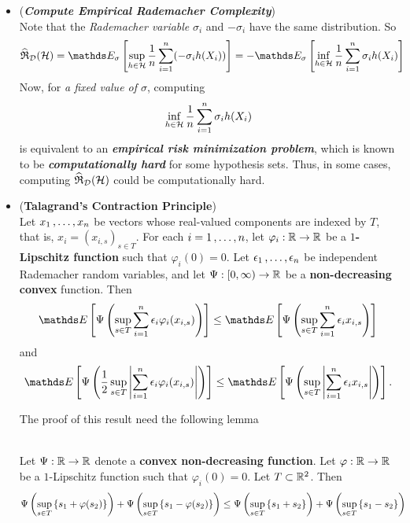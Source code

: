 \documentclass[11pt]{article}
\begin{document}
\begin{itemize}
\item \begin{remark} (\emph{\textbf{Compute Empirical Rademacher Complexity}})\\
Note that the \emph{Rademacher variable} $\sigma_i$ and $-\sigma_i$ have the same distribution. So
\begin{align*}
\widehat{\frR}_{\cD}(\cH)&= \E{\sigma}{\sup_{h \in \cH}\frac{1}{n}\sum_{i=1}^{n}(-\sigma_{i}h(X_i))} = -\E{\sigma}{\inf_{h \in \cH}\frac{1}{n}\sum_{i=1}^{n}\sigma_{i}h(X_i)}
\end{align*} Now, for \emph{a fixed value of $\sigma$}, computing 
\begin{align*}
\inf_{h \in {\mathcal H}}\frac{1}{n}\sum_{i=1}^{n}\sigma_{i}h(X_i)
\end{align*} is equivalent to an \emph{\textbf{empirical risk minimization problem}}, which is known to be \emph{\textbf{computationally hard}} for some hypothesis sets. Thus, in some cases, computing $\widehat{{\mathfrak R}}_{{\mathcal D}}({\mathcal H})$ could be computationally hard. 
\end{remark}

\item \begin{proposition}(\textbf{Talagrand's Contraction Principle}) \citep{boucheron2013concentration, vershynin2018high}\\
Let $x_1 \,{,}\ldots{,}\, x_n$ be vectors whose real-valued components are indexed by $T$, that is, $x_i = (x_{i,s})_{s \in T}$. For each $i = 1 \,{,}\ldots{,}\, n$, let $\varphi_i : {\mathbb R} \to {\mathbb R}$ be a \textbf{$1$-Lipschitz function} such that $\varphi_i(0) = 0$. Let $\epsilon_1 \,{,}\ldots{,}\, \epsilon_n$ be independent Rademacher random variables, and let $\Psi: [0, \infty) \to {\mathbb R}$ be a \textbf{non-decreasing convex} function.  Then
\begin{align}
\E{}{\Psi\paren{\sup_{s\in T}\sum_{i=1}^n \epsilon_i \varphi_i(x_{i,s})}} \le \E{}{\Psi\paren{\sup_{s\in T}\sum_{i=1}^n \epsilon_i  x_{i,s}}}\label{ineqn: contraction_principle_1}
\end{align} and
\begin{align}
\E{}{\Psi\paren{\frac{1}{2}\sup_{s\in T}\abs{\sum_{i=1}^n \epsilon_i \varphi_i(x_{i,s})}}} \le \E{}{\Psi\paren{\sup_{s\in T}\abs{\sum_{i=1}^n \epsilon_i  x_{i,s}}}}.\label{ineqn: contraction_principle_2}
\end{align}
\end{proposition}

The proof of this result need  the following lemma
\begin{lemma}\citep{boucheron2013concentration, vershynin2018high}\\
Let $\Psi : {\mathbb R}\to {\mathbb R}$ denote a \textbf{convex non-decreasing function}. Let $\varphi: {\mathbb R} \to {\mathbb R}$ be a $1$-Lipschitz function such that $\varphi_i(0) = 0$. Let $T \subset {\mathbb R}^2$. Then
\begin{align*}
\Psi\left(\sup_{s \in T}\left\{s_1 + \varphi(s_2)\right\}\right) + \Psi\left(\sup_{s \in T}\left\{s_1 - \varphi(s_2)\right\}\right) &\le \Psi\left(\sup_{s \in T}\left\{s_1 + s_2\right\}\right) + \Psi\left(\sup_{s \in T}\left\{s_1 - s_2\right\}\right)
\end{align*}
\end{lemma}


\end{itemize}
\end{document}
